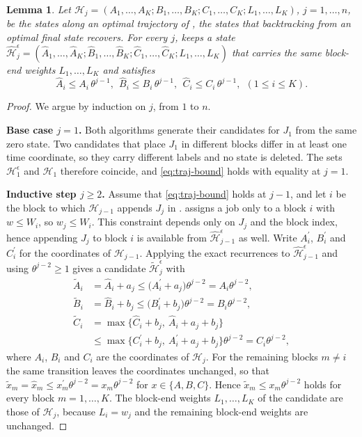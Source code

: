 ﻿\documentclass[12pt]{article}
\newtheorem{lemma}{Lemma}[section]
\begin{document}
\begin{sloppypar}
\begin{lemma}\label{lem:traj-approx}
Let $\mathscr{H}_{j}=(A_1,\dots,A_K; B_1,\dots,B_K; C_1,\dots,C_K; L_1,\dots,L_K)$, $j=1,\dots,n$, be the
states along an optimal trajectory of , the states that backtracking from an optimal
final state recovers. For every $j$,  keeps a state
$\hat{\mathscr{H}}^{\epsilon}_{j}=(\hat A_1,\dots,\hat A_K; \hat B_1,\dots,\hat B_K; \hat C_1,\dots,\hat C_K; L_1,\dots, L_K)$
that carries the same block-end weights $L_1,\dots,L_K$ and satisfies
\begin{equation}\label{eq:traj-bound}
\hat A_i\le A_i\,\theta^{j-1},~~
\hat B_i\le B_i\,\theta^{j-1},~~
\hat C_i\le C_i\,\theta^{j-1},~~(1\le i\le K).
\end{equation}
\end{lemma}

\begin{proof}
We argue by induction on $j$, from $1$ to $n$.

\textbf{Base case $j=1$.} Both algorithms generate their candidates for $J_1$ from the same zero
state. Two candidates that place $J_1$ in different blocks differ in at least one time coordinate,
so they carry different labels and no state is deleted. The sets $\mathscr{H}^{\epsilon}_{1}$ and
$\mathscr{H}_{1}$ therefore coincide, and \cref{eq:traj-bound} holds with equality at $j=1$.

\textbf{Inductive step $j\ge2$.} Assume that \cref{eq:traj-bound} holds at $j-1$, and let $i$ be the
block to which $\mathscr{H}_{j-1}$ appends $J_j$ in . 
assigns a job only to a block $i$ with $w\le W_i$, so $w_j\le W_i$. This constraint depends only on
$J_j$ and the block index, hence appending $J_j$ to block $i$ is available from
$\hat{\mathscr{H}}^{\epsilon}_{j-1}$ as well. Write $A^{\prime}_i$, $B^{\prime}_i$ and $C^{\prime}_i$
for the coordinates of $\mathscr{H}_{j-1}$. Applying the exact recurrences to
$\hat{\mathscr{H}}^{\epsilon}_{j-1}$ and using $\theta^{j-2}\ge1$ gives a candidate
$\tilde{\mathscr{H}}^{\epsilon}_{j}$ with
\begin{align*}
\tilde A_{i} &= \hat A_{i}+a_j
   \le \big(A^{\prime}_{i}+a_j\big)\theta^{j-2}=A_{i}\theta^{j-2},\\
\tilde B_{i} &= \hat B_{i}+b_j
   \le \big(B^{\prime}_{i}+b_j\big)\theta^{j-2}=B_{i}\theta^{j-2},\\
\tilde C_{i} &= \max\big\{\hat C_{i}+b_j,\ \hat A_{i}+a_j+b_j\big\}\\
   &\le \max\big\{C^{\prime}_{i}+b_j,\ A^{\prime}_{i}+a_j+b_j\big\}\theta^{j-2}
   = C_{i}\theta^{j-2},
\end{align*}
where $A_i$, $B_i$ and $C_i$ are the coordinates of $\mathscr{H}_{j}$. For the remaining blocks
$m\ne i$ the same transition leaves the coordinates unchanged, so that
$\tilde x_m=\hat x_m\le x^{\prime}_m\theta^{j-2}=x_m\theta^{j-2}$ for $x\in\{A,B,C\}$. Hence
$\tilde x_m\le x_m\theta^{j-2}$ holds for every block $m=1,\dots,K$. The block-end weights
$L_1,\dots,L_K$ of the candidate are those of $\mathscr{H}_{j}$, because $L_i=w_j$ and the
remaining block-end weights are unchanged.


\end{proof}
\end{sloppypar}
\end{document}
